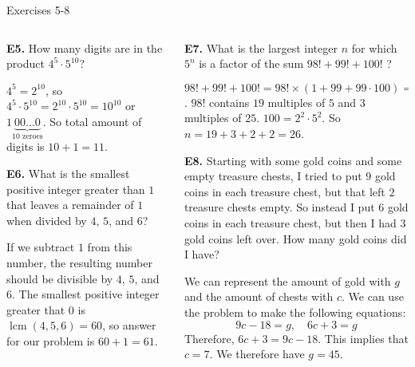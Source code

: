 \documentclass[9pt,aspectratio=169]{beamer}
\DeclareMathOperator{\lcm}{lcm}
\begin{document}
\begin{frame}{Exercises 5-8}
  \begin{columns}[T]
    \begin{column}{0.5\textwidth}
      \begin{problem}
        \textbf{E5.} How many digits are in the product $4^5 \cdot 5^{10}$?
      \end{problem}\pause
      $4^5 = 2^{10}$, so $4^5 \cdot 5^{10} = 2^{10} \cdot 5^{10} = 10^{10}$ or $1\underbrace{00\ldots0}_{10 \text{ zeroes}}$. So total amount of digits is $10 + 1 = \boxed{11}$.\pause
      \begin{problem}
        \textbf{E6.} What is the smallest positive integer greater than $1$ that leaves a remainder of $1$ when divided by $4$, $5$, and $6$?
      \end{problem}\pause
      If we subtract $1$ from this number, the resulting number should be divisible by $4$, $5$, and $6$. The smallest positive integer greater that $0$ is $\lcm(4, 5, 6) = 60$, so answer for our problem is $60 + 1 = \boxed{61}$.\pause
    \end{column}
    \begin{column}{0.5\textwidth}
      \begin{problem}
        \textbf{E7.} What is the largest integer $n$ for which $5^n$ is a factor of the sum $98!+99!+100!$ ?
      \end{problem}\pause
      $98! + 99! + 100! = 98! \times (1 + 99 + 99 \cdot 100) = 98! \cdot 100 \cdot 100$. $98!$ contains $19$ multiples of $5$ and $3$ multiples of $25$. $100 = 2^2 \cdot 5^2$. So $n = 19 + 3 + 2 + 2 = \boxed{26}$. \pause
      \begin{problem}
        \textbf{E8.} Starting with some gold coins and some empty treasure chests, I tried to put $9$ gold coins in each treasure chest, but that left $2$ treasure chests empty. So instead I put $6$ gold coins in each treasure chest, but then I had $3$ gold coins left over. How many gold coins did I have?
      \end{problem}\pause
      We can represent the amount of gold with $g$ and the amount of chests with $c$. We can use the problem to make the following equations:
      \[9c-18 = g,\quad 6c+3 = g\]
      Therefore, $6c+3 = 9c-18.$ This implies that $c = 7.$ We therefore have $g = \boxed{45}.$
    \end{column}
  \end{columns}
\end{frame}
\end{document}
